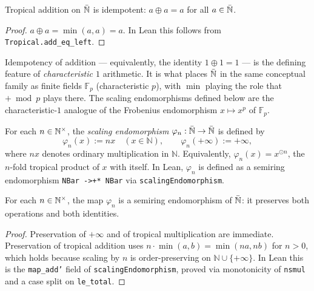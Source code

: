 \begin{lemma}[label=lem:Nbar_idempotent, uses=def:Nbar]
  \label{lem:Nbar_idempotent}\leanok
  Tropical addition on $\bar{\mathbb{N}}$ is idempotent: $a \oplus a = a$ for all
  $a \in \bar{\mathbb{N}}$.
\end{lemma}
\begin{proof}
  $a \oplus a = \min(a,a) = a$. In Lean this follows from
  \texttt{Tropical.add\_eq\_left}.
\end{proof}

\begin{remark}
  Idempotency of addition --- equivalently, the identity $1 \oplus 1 = 1$
  --- is the defining feature of \emph{characteristic $1$} arithmetic.
  It is what places $\bar{\mathbb{N}}$ in the same conceptual family as finite fields
  $\mathbb{F}_p$ (characteristic $p$), with $\min$ playing the role that
  $+\bmod p$ plays there.  The scaling endomorphisms defined below are the
  characteristic-$1$ analogue of the Frobenius endomorphism $x \mapsto x^p$
  of $\mathbb{F}_p$.
\end{remark}

\begin{definition}[label=def:scaling_action, uses=def:Nbar, def:Nplus]
  \label{def:scaling_action}\leanok
  For each $n \in \mathbb{N}^{\times}$, the \emph{scaling endomorphism}
  $\varphi_n : \bar{\mathbb{N}} \to \bar{\mathbb{N}}$ is defined by
  \[
    \varphi_n(x) := nx \quad (x \in \mathbb{N}),
    \qquad \varphi_n(+\infty) := +\infty,
  \]
  where $nx$ denotes ordinary multiplication in $\mathbb{N}$.
  Equivalently, $\varphi_n(x) = x^{\odot n}$, the $n$-fold tropical
  product of $x$ with itself.
  In Lean, $\varphi_n$ is defined as a semiring endomorphism
  \texttt{NBar~->+*~NBar} via \texttt{scalingEndomorphism}.
\end{definition}

\begin{lemma}[label=lem:scaling_semiring_hom, uses=def:scaling_action, lem:Nbar_semiring]
  \label{lem:scaling_semiring_hom}\leanok
  For each $n \in \mathbb{N}^{\times}$, the map $\varphi_n$ is a semiring endomorphism
  of $\bar{\mathbb{N}}$: it preserves both operations and both identities.
\end{lemma}
\begin{proof}
  Preservation of $+\infty$ and of tropical multiplication are immediate.
  Preservation of tropical addition uses $n \cdot \min(a,b) = \min(na,nb)$
  for $n > 0$, which holds because scaling by $n$ is order-preserving on
  $\mathbb{N} \cup \{+\infty\}$.  In Lean this is the \texttt{map\_add'}
  field of \texttt{scalingEndomorphism}, proved via monotonicity of
  \texttt{nsmul} and a case split on \texttt{le\_total}.
\end{proof}

